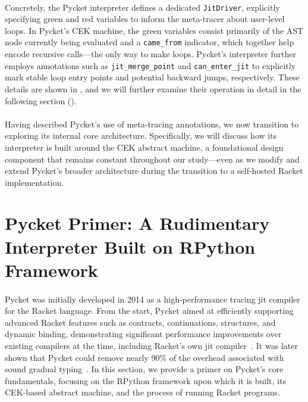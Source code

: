 
        \paragraph{}%
            Concretely, the Pycket interpreter defines a dedicated \texttt{JitDriver}, explicitly specifying green and red variables to inform the meta-tracer about user-level loops. In Pycket’s CEK machine, the green variables consist primarily of the AST node currently being evaluated and a \texttt{came\_from} indicator, which together help encode recursive calls—the only way to make loops. Pycket’s interpreter further employs annotations such as \texttt{jit\_merge\_point} and \texttt{can\_enter\_jit} to explicitly mark stable loop entry points and potential backward jumps, respectively. These details are shown in , and we will further examine their operation in detail in the following section ().

        \paragraph{}%
            Having described Pycket’s use of meta-tracing annotations, we now transition to exploring its internal core architecture. Specifically, we will discuss how its interpreter is built around the CEK abstract machine, a foundational design component that remains constant throughout our study—even as we modify and extend Pycket’s broader architecture during the transition to a self-hosted Racket implementation.

    \section[\texorpdfstring{Pycket Primer: A Rudimentary Interpreter Built on RPython Framework}{Pycket Primer}]{Pycket Primer: A Rudimentary Interpreter Built on RPython Framework}
        \label{section:pycket-primer}

        \paragraph{}%
            Pycket was initially developed in 2014 as a high-performance tracing \gls{jit} compiler for the Racket language. From the start, Pycket aimed at efficiently supporting advanced Racket features such as contracts, continuations, structures, and dynamic binding, demonstrating significant performance improvements over existing compilers at the time, including Racket's own \gls{jit} compiler~\cite{pycketmain}. It was later shown that Pycket could remove nearly 90\% of the overhead associated with sound gradual typing~\cite{pycketmain2}. In this section, we provide a primer on Pycket's core fundamentals, focusing on the RPython framework upon which it is built, its CEK-based abstract machine, and the process of running Racket programs.

